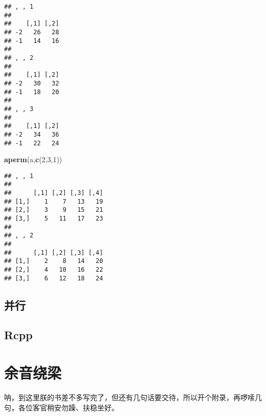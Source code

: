 \documentclass[]{ctexbook}
\newenvironment{Shaded}{\begin{snugshade}}{\end{snugshade}}
\newcommand{\DecValTok}[1]{\textcolor[rgb]{0.00,0.00,0.81}{#1}}
\newcommand{\KeywordTok}[1]{\textcolor[rgb]{0.13,0.29,0.53}{\textbf{#1}}}
\newcommand{\NormalTok}[1]{#1}
\begin{document}
\begin{verbatim}
## , , 1
## 
##    [,1] [,2]
## -2   26   28
## -1   14   16
## 
## , , 2
## 
##    [,1] [,2]
## -2   30   32
## -1   18   20
## 
## , , 3
## 
##    [,1] [,2]
## -2   34   36
## -1   22   24
\end{verbatim}

\begin{Shaded}
\begin{Highlighting}[]
\KeywordTok{aperm}\NormalTok{(a,}\KeywordTok{c}\NormalTok{(}\DecValTok{2}\NormalTok{,}\DecValTok{3}\NormalTok{,}\DecValTok{1}\NormalTok{))}
\end{Highlighting}
\end{Shaded}

\begin{verbatim}
## , , 1
## 
##      [,1] [,2] [,3] [,4]
## [1,]    1    7   13   19
## [2,]    3    9   15   21
## [3,]    5   11   17   23
## 
## , , 2
## 
##      [,1] [,2] [,3] [,4]
## [1,]    2    8   14   20
## [2,]    4   10   16   22
## [3,]    6   12   18   24
\end{verbatim}

\hypertarget{section-12}{%
\section{并行}\label{section-12}}

\hypertarget{rcpp}{%
\section{Rcpp}\label{rcpp}}

\cleardoublepage

\hypertarget{appendix-}{%
\appendix {}}


\hypertarget{sound}{%
\chapter{余音绕梁}\label{sound}}

呐，到这里朕的书差不多写完了，但还有几句话要交待，所以开个附录，再啰嗦几句，各位客官稍安勿躁、扶稳坐好。



\backmatter
\printindex
\end{document}
